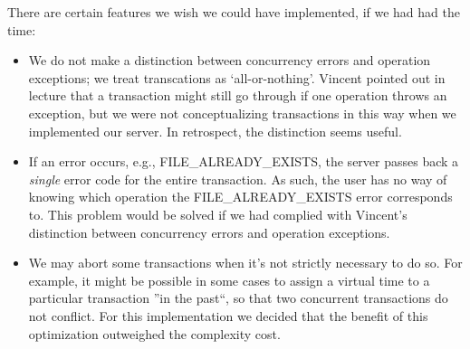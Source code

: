 \documentclass[12pt]{article}
\begin{document}
There are certain features we wish we could have implemented, if we had had the time:

\begin{itemize}
\item We do not make a distinction between concurrency errors and operation exceptions; we treat transcations as `all-or-nothing'. Vincent pointed out in lecture that a transaction might still go through if one operation throws an exception, but we were not conceptualizing transactions in this way when we implemented our server. In retrospect, the distinction seems useful.
\item If an error occurs, e.g., \textsc{FILE\_ALREADY\_EXISTS}, the server passes back a \emph{single} error code for the entire transaction. As such, the user has no way of knowing which operation the \textsc{FILE\_ALREADY\_EXISTS} error corresponds to. This problem would be solved if we had complied with Vincent's distinction between concurrency errors and operation exceptions.
\item We may abort some transactions when it's not strictly necessary to do so. For example, it might be possible in some cases to assign a virtual time to a particular transaction ''in the past``, so that two concurrent transactions do not conflict. For this implementation we decided that the benefit of this optimization outweighed the complexity cost.
\end{itemize}
\end{document}
